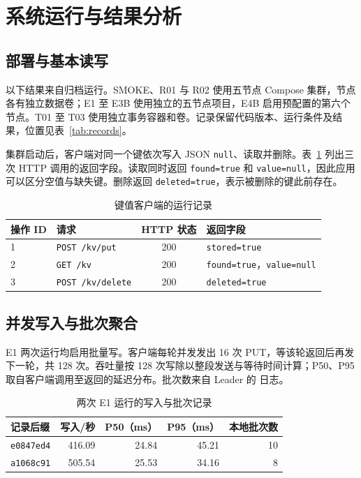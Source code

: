 \clearpage
\section{系统运行与结果分析}

\subsection{部署与基本读写}
以下结果来自归档运行。SMOKE、R01 与 R02 使用五节点 Compose 集群，节点各有独立数据卷；E1 至 E3B 使用独立的五节点项目，E4B 启用预配置的第六个节点。T01 至 T03 使用独立事务容器和卷。记录保留代码版本、运行条件及结果，位置见表~\ref{tab:records}。

集群启动后，客户端对同一个键依次写入 JSON \texttt{null}、读取并删除。表~\ref{tab:kv-results} 列出三次 HTTP 调用的返回字段。读取同时返回 \texttt{found=true} 和 \texttt{value=null}，因此应用可以区分空值与缺失键。删除返回 \texttt{deleted=true}，表示被删除的键此前存在。

\begin{table}[htbp]
\centering
\caption{键值客户端的运行记录}
\label{tab:kv-results}
\begin{tabularx}{\linewidth}{@{}l l c X@{}}
\toprule
操作 ID & 请求 & HTTP 状态 & 返回字段 \\
\midrule
1 & \texttt{POST /kv/put} & 200 & \texttt{stored=true} \\
2 & \texttt{GET /kv} & 200 & \texttt{found=true}，\texttt{value=null} \\
3 & \texttt{POST /kv/delete} & 200 & \texttt{deleted=true} \\
\bottomrule
\end{tabularx}
\end{table}

\subsection{并发写入与批次聚合}
E1 两次运行均启用批量写。客户端每轮并发发出 16 次 PUT，等该轮返回后再发下一轮，共 128 次。吞吐量按 128 次写除以整段发送与等待时间计算；P50、P95 取自客户端调用至返回的延迟分布。批次数来自 Leader 的  日志。

\begin{table}[htbp]
\centering
\caption{两次 E1 运行的写入与批次记录}
\label{tab:batch-results}
\begin{tabularx}{\linewidth}{@{}X r r r r@{}}
\toprule
记录后缀 & 写入/秒 & P50（ms） & P95（ms） & 本地批次数 \\
\midrule
\texttt{e0847ed4} & 416.09 & 24.84 & 45.21 & 10 \\
\texttt{a1068c91} & 505.54 & 25.53 & 34.16 & 8 \\
\bottomrule
\end{tabularx}
\end{table}

